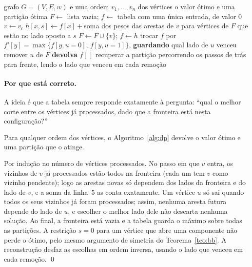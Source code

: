 \begin{algorithm}[ht]
\caption{Programação dinâmica sobre a fronteira}\label{alg:dp}
\begin{algorithmic}[1]
\Require grafo $G=(V,E,w)$ e uma ordem $v_1,\dots,v_n$ dos vértices
\Ensure o valor ótimo e uma partição ótima
\State $F\gets$ lista vazia; \quad $f\gets$ tabela com uma única entrada, de valor $0$
  \State $v\gets v_t$
   
    \State $h[x,s]\gets f[x]+{}$soma dos pesos das arestas de $v$ para vértices de $F$ que estão no lado oposto a $s$
  \EndFor
  \State $F\gets F\cup\{v\}$; \quad $f\gets h$ 
    \State trocar $f$ por $f'[y]=\max\{f[y,u{=}0],\,f[y,u{=}1]\}$, \textbf{guardando} qual lado de $u$ venceu
    \State remover $u$ de $F$
  \EndFor
\EndFor
\State \textbf{devolva} $f[\,]$ 
\State recuperar a partição percorrendo os passos de trás para frente, lendo o lado que venceu em cada remoção
\end{algorithmic}
\end{algorithm}

\paragraph{Por que está correto.} A ideia é que a tabela sempre responde exatamente à pergunta: ``qual o melhor corte entre os vértices já processados, dado que a fronteira está nesta configuração?''

\begin{teorema}[Correção]\label{teo:dp}
Para qualquer ordem dos vértices, o Algoritmo~\ref{alg:dp} devolve o valor ótimo e uma partição que o atinge.
\end{teorema}
\begin{prova}
Por indução no número de vértices processados. No passo em que $v$ entra, os vizinhos de $v$ já processados estão todos na fronteira (cada um tem $v$ como vizinho pendente); logo as arestas novas só dependem dos lados da fronteira e do lado de $v$, e a soma da linha~5 as conta exatamente. Um vértice $u$ só sai quando todos os seus vizinhos já foram processados; assim, nenhuma aresta futura depende do lado de $u$, e escolher o melhor lado dele não descarta nenhuma solução. Ao final, a fronteira está vazia e a tabela guarda o máximo sobre todas as partições. A restrição $s=0$ para um vértice que abre uma componente não perde o ótimo, pelo mesmo argumento de simetria do Teorema~\ref{teo:bb}. A reconstrução desfaz as escolhas em ordem inversa, usando o lado que venceu em cada remoção. \qed
\end{prova}

